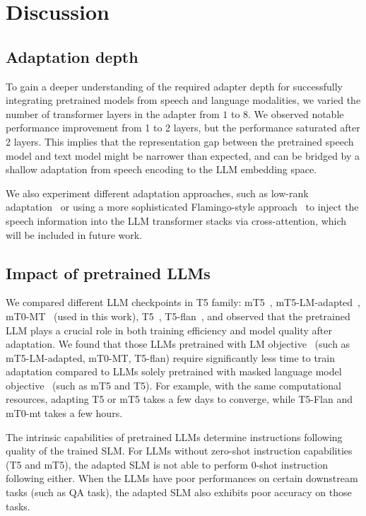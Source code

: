 \section{Discussion}
\label{sec:discussion}

\subsection{Adaptation depth}

To gain a deeper understanding of the required adapter depth for successfully integrating pretrained models from speech and language modalities, we varied the number of transformer layers in the adapter from $1$ to $8$. We observed notable performance improvement from 1 to 2 layers, but the performance saturated after 2 layers. This implies that the representation gap between the pretrained speech model and text model might be narrower than expected, and can be bridged by a shallow adaptation from speech encoding to the LLM embedding space. 

We also experiment different adaptation approaches, such as low-rank adaptation~\cite{hu2021lora} or using a more sophisticated Flamingo-style approach~\cite{alayrac2022flamingo} to inject the speech information into the LLM transformer stacks via cross-attention, which will be included in future work.

\subsection{Impact of pretrained LLMs}

We compared different LLM checkpoints in T5 family: mT5~\cite{xue2020mt5}, mT5-LM-adapted~\cite{vu2022overcoming}, mT0-MT~\cite{muennighoff2022crosslingual} (used in this work), T5~\cite{raffel2020exploring}, T5-flan~\cite{chung2022scaling}, and observed that the pretrained LLM plays a crucial role in both training efficiency and model quality after adaptation. We found that those LLMs pretrained with LM objective~\cite{bengio2000neural} (such as mT5-LM-adapted, mT0-MT, T5-flan) require significantly less time to train adaptation compared to LLMs solely pretrained with masked language model objective~\cite{devlin2018bert} (such as mT5 and T5). For example, with the same computational resources, adapting T5 or mT5 takes a few days to converge, while T5-Flan and mT0-mt takes a few hours.

The intrinsic capabilities of pretrained LLMs determine instructions following quality of the trained SLM. For LLMs without zero-shot instruction capabilities (T5 and mT5), the adapted SLM is not able to perform 0-shot instruction following either. When the LLMs have poor performances on certain downstream tasks (such as QA task), the adapted SLM also exhibits poor accuracy on those tasks.

